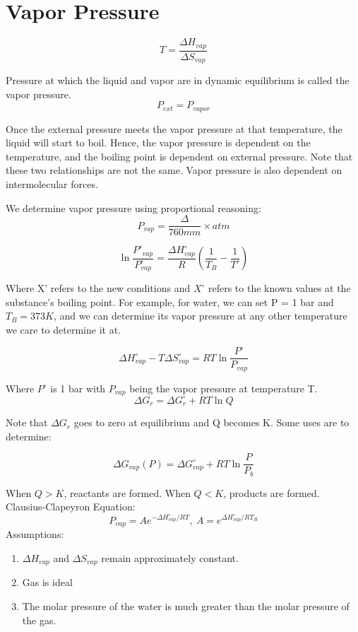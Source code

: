 \documentclass{article}
\begin{document}
\section{Vapor Pressure}
\[
T = \frac{\Delta H_{vap}}{\Delta S_{vap}}
\]

Pressure at which the liquid and vapor are in dynamic equilibrium is called the vapor pressure. 
\[
P_{ext}=P_{vapor}
\]



Once the external pressure meets the vapor pressure at that temperature, the liquid will start to boil. Hence, the vapor pressure is dependent on the temperature, and the boiling point is dependent on external pressure. Note that these two relationships are not the same. Vapor pressure is also dependent on intermolecular forces.

We determine vapor pressure using proportional reasoning:
\[
P_{vap} = \frac{\Delta}{760mm} \times atm
\]


\[
\ln{\frac{P'_{vap}}{P^{\circ}_{vap}}} = \frac{\Delta H^{\circ}_{vap}}{R} (\frac{1}{T_B}-\frac{1}{T'})
\]

\begin{center}
Where X' refers to the new conditions and $X^{\circ}$ refers to the known values at the substance's boiling point. For example, for water, we can set P = 1 bar and $T_B = 373K$, and we can determine its vapor pressure at any other temperature we care to determine it at.
\end{center}

\[
\Delta H^{\circ}_{vap} - T \Delta S^{\circ}_{vap} = RT \ln \frac{P^{\circ}}{P_{vap}}
\]

Where $P^{\circ}$ is 1 bar with $P_{vap}$ being the vapor pressure at temperature T.\\

\[
\Delta G_r = \Delta G_r^{\circ}+RT\ln Q
\]

Note that $\Delta G_r$ goes to zero at equilibrium and Q becomes K. Some uses are to determine:

\[
\Delta G_{vap} (P) = \Delta G_{vap}^{\circ}+RT\ln \frac{P}{P_b}
\]

When $Q>K$, reactants are formed. When $Q<K$, products are formed.\\

Clausius-Clapeyron Equation:
\[
P_{vap} = Ae^{-\Delta H^{\circ}_{vap}/RT},\ A=e^{\Delta H^{\circ}_{vap}/RT_B}
\]
Assumptions: 
\begin{enumerate}
\item$\Delta H_{vap}$ and $\Delta S_{vap}$ remain approximately constant.
\item Gas is ideal
\item The molar pressure of the water is much greater than the molar pressure of the gas. 
\end{enumerate}
\end{document}
